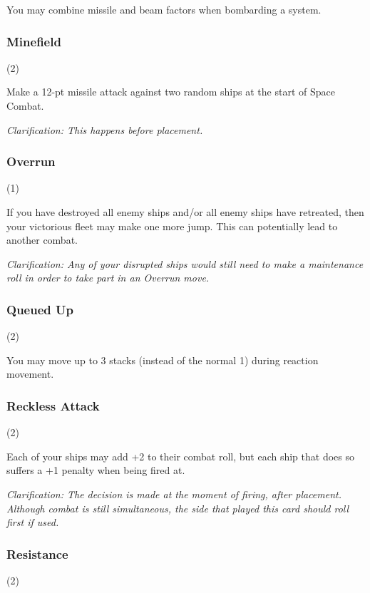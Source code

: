 
You may combine missile and beam factors when bombarding a system.

\subsubsection{Minefield} (2)


Make a 12-pt missile attack against two random ships at the start of Space Combat.

\textit{Clarification: This happens before placement.}

\subsubsection{Overrun} (1)


If you have destroyed all enemy ships and/or all enemy ships have retreated, then your victorious fleet may make one more jump. This can potentially lead to another combat.

\textit{Clarification: Any of your disrupted ships would still need to make a maintenance roll in order to take part in an Overrun move.}

\subsubsection{Queued Up} (2)


You may move up to 3 stacks (instead of the normal 1) during reaction movement.

\subsubsection{Reckless Attack} (2)


Each of your ships may add +2 to their combat roll, but each ship that does so suffers a +1 penalty when being fired at.

\textit{Clarification: The decision is made at the moment of firing, after placement. Although combat is still simultaneous, the side that played this card should roll first if used.}

\subsubsection{Resistance} (2)

